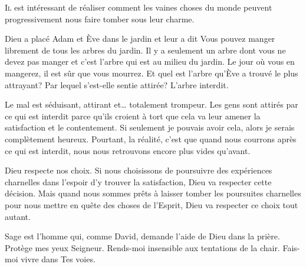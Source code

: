 

\lettrine{I}{l} est intéressant de réaliser comment les vaines choses
 du monde peuvent progressivement nous faire tomber sous leur charme.

Dieu a placé Adam et Ève dans le jardin et leur a dit\frcolon{}
 \Og Vous pouvez manger librement de tous les arbres du jardin.
 Il y a seulement un arbre dont vous ne devez pas manger et c'est l'arbre
 qui est au milieu du jardin. Le jour où vous en mangerez,
 il est sûr que vous mourrez. \Fg{}
 Et quel est l'arbre qu'Ève a trouvé le plus attrayant?
 Par lequel s'est-elle sentie attirée? L'arbre interdit.

Le mal est séduisant, attirant et\dots{} totalement trompeur.
 Les gens sont attirés par ce qui est interdit parce qu'ils croient
 à tort que cela va leur amener la satisfaction et le contentement.
 \Og Si seulement je pouvais avoir cela,
 alors je serais complètement heureux. \Fg{}
 Pourtant, la réalité, c'est que quand nous courrons après ce qui est interdit,
 nous nous retrouvons encore plus vides qu'avant.


Dieu respecte nos choix. Si nous choisissons de poursuivre des expériences
 charnelles dans l'espoir d'y trouver la satisfaction,
 Dieu va respecter cette décision.
 Mais quand nous sommes prêts à laisser tomber les poursuites charnelles
 pour nous mettre en quête des choses de l'Esprit,
 Dieu va respecter ce choix tout autant.

Sage est l'homme qui, comme David, demande l'aide de Dieu dans la prière.
 \Og Protège mes yeux Seigneur.
 Rends-moi insensible aux tentations de la chair.
 Fais-moi vivre dans Tes voies. \Fg{}

\dvrule





